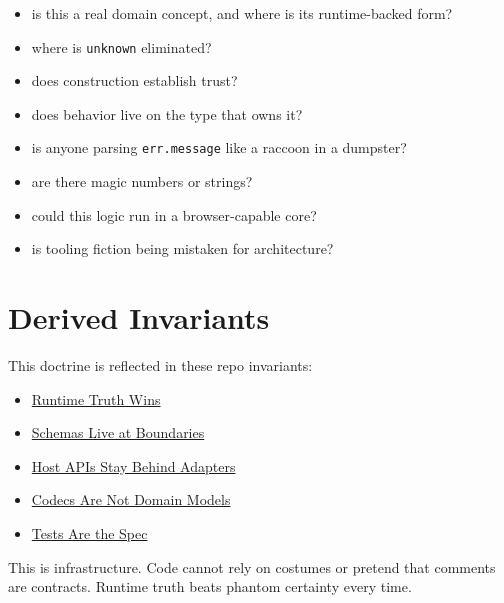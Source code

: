 \begin{itemize}
\tightlist
\item
  is this a real domain concept, and where is its runtime-backed form?
\item
  where is \texttt{u\allowbreak{}n\allowbreak{}k\allowbreak{}n\allowbreak{}o\allowbreak{}w\allowbreak{}n} eliminated?
\item
  does construction establish trust?
\item
  does behavior live on the type that owns it?
\item
  is anyone parsing \texttt{e\allowbreak{}r\allowbreak{}r\allowbreak{}.\allowbreak{}m\allowbreak{}e\allowbreak{}s\allowbreak{}s\allowbreak{}a\allowbreak{}g\allowbreak{}e} like a raccoon in a dumpster?
\item
  are there magic numbers or strings?
\item
  could this logic run in a browser-capable core?
\item
  is tooling fiction being mistaken for architecture?
\end{itemize}

\section{Derived Invariants}\label{record-060-derived-invariants}

This doctrine is reflected in these repo invariants:

\begin{itemize}
\tightlist
\item
  \href{https://github.com/flyingrobots/bijou/blob/cbd70612140e7a450d764b3c7be1c6af878b99bc/docs/invariants/runtime-truth-wins.md}{Runtime Truth Wins}
\item
  \href{https://github.com/flyingrobots/bijou/blob/cbd70612140e7a450d764b3c7be1c6af878b99bc/docs/invariants/schemas-live-at-boundaries.md}{Schemas Live at Boundaries}
\item
  \href{https://github.com/flyingrobots/bijou/blob/cbd70612140e7a450d764b3c7be1c6af878b99bc/docs/invariants/host-apis-stay-behind-adapters.md}{Host APIs Stay Behind Adapters}
\item
  \href{https://github.com/flyingrobots/bijou/blob/cbd70612140e7a450d764b3c7be1c6af878b99bc/docs/invariants/codecs-are-not-domain-models.md}{Codecs Are Not Domain Models}
\item
  \href{https://github.com/flyingrobots/bijou/blob/cbd70612140e7a450d764b3c7be1c6af878b99bc/docs/invariants/tests-are-the-spec.md}{Tests Are the Spec}
\end{itemize}

This is infrastructure. Code cannot rely on costumes or pretend that comments are contracts. Runtime truth beats phantom certainty every time.

